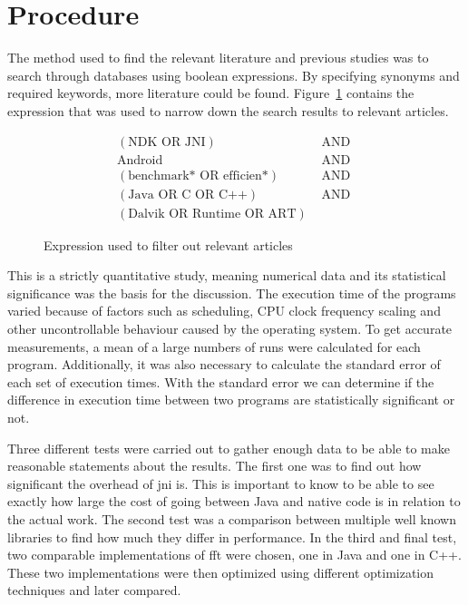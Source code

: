 \section{Procedure}

The method used to find the relevant literature and previous studies was to search through databases using boolean expressions. By specifying synonyms and required keywords, more literature could be found. Figure~\ref{fig:db:search} contains the expression that was used to narrow down the search results to relevant articles.

\ifrelease
\begin{figure}[H]
    \centering
    \begin{align*}
        (\text{NDK OR JNI})               & \text{ AND } \\
        \text{Android}                    & \text{ AND } \\
        (\text{benchmark* OR efficien*})  & \text{ AND } \\
        (\text{Java OR C OR C++})         & \text{ AND } \\
        (\text{Dalvik OR Runtime OR ART}) &
    \end{align*}
    \caption{Expression used to filter out relevant articles}
    \label{fig:db:search}
\end{figure}
\fi

This is a strictly quantitative study, meaning numerical data and its statistical significance was the basis for the discussion. The execution time of the programs varied because of factors such as scheduling, CPU clock frequency scaling and other uncontrollable behaviour caused by the operating system. To get accurate measurements, a mean of a large numbers of runs were calculated for each program. Additionally, it was also necessary to calculate the standard error of each set of execution times. With the standard error we can determine if the difference in execution time between two programs are statistically significant or not.

Three different tests were carried out to gather enough data to be able to make reasonable statements about the results. The first one was to find out how significant the overhead of \gls{jni} is. This is important to know to be able to see exactly how large the cost of going between Java and native code is in relation to the actual work. The second test was a comparison between multiple well known libraries to find how much they differ in performance. In the third and final test, two comparable implementations of \gls{fft} were chosen, one in Java and one in C++. These two implementations were then optimized using different optimization techniques and later compared.

